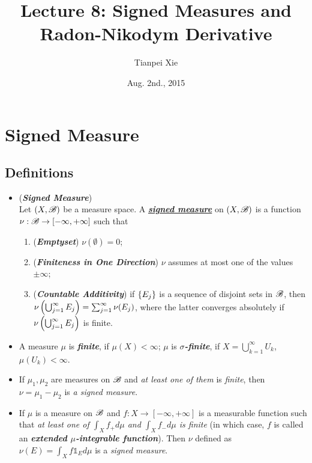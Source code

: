 \documentclass[11pt]{article}
\begin{document}
\title{Lecture 8: Signed Measures and Radon-Nikodym Derivative}
\author{ Tianpei Xie}
\date{ Aug. 2nd., 2015 }
\maketitle
\tableofcontents
\newpage
\section{Signed Measure}
\subsection{Definitions}
\begin{itemize}
\item \begin{definition} (\emph{\textbf{Signed Measure}})\\
Let $(X, {\mathscr B})$ be a measure space. A \underline{\emph{\textbf{signed measure}}} on $(X, {\mathscr B})$ is a function $\nu: {\mathscr B} \rightarrow [-\infty, +\infty]$ such that 
\begin{enumerate}
\item (\emph{\textbf{Emptyset}}) $\nu(\emptyset)= 0$;
\item (\emph{\textbf{Finiteness in One Direction}}) $\nu$ assumes at most one of the values $\pm \infty$;
\item (\emph{\textbf{Countable Additivity}}) if $\left\{E_{j}\right\}$ is a sequence of disjoint sets in ${\mathscr B}$, then $\nu\left(\bigcup_{j=1}^{\infty}E_{j}\right)= \sum_{j=1}^{\infty}\nu(E_{j})$, where the latter converges absolutely if $\nu\left(\bigcup_{j=1}^{\infty}E_{j}\right)$ is finite.
\end{enumerate} 
\end{definition}

\item \begin{definition}
A measure $\mu$ is \emph{\textbf{finite}}, if $\mu(X)<\infty$; $\mu$ is \emph{\textbf{$\sigma$-finite}}, if $X= \bigcup_{k=1}^{\infty}U_{k}$, $\mu(U_k)<\infty$. 
\end{definition}

\item \begin{example}
If $\mu_1, \mu_2$ are measures on ${\mathscr B}$ and \emph{at least one of them} is \emph{finite}, then $\nu = \mu_1 - \mu_2$ is \emph{a signed measure}. 
\end{example}

\item \begin{example}
If $\mu$ is a measure on ${\mathscr B}$ and $f: X \rightarrow [-\infty, +\infty]$ is a measurable function such that \emph{at least one of $\int_{X} f_{+} d\mu$ and $\int_X f_{-} d\mu$ is finite} (in which case,  $f$ is called an \emph{\textbf{extended $\mu$-integrable function}}). Then $\nu$ defined as $\nu(E) = \int_{X} f \mathds{1}_{E} d\mu$ is a \emph{signed measure}.
\end{example}


\end{itemize}
\end{document}
